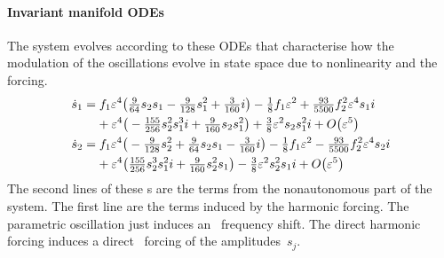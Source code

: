  
\paragraph{Invariant manifold ODEs} 
The system evolves according to these ODEs that characterise
how the modulation of the oscillations evolve in state space
due to nonlinearity and the forcing.
\begin{align*}&
\dot s_{1}=f_1 \varepsilon^{4} \big(\tfrac{9}{64} s_{2} s_{1}-\tfrac{9}{128} s_{1}^{2}+\tfrac{3}{160} i
\big)-\tfrac{1}{8} f_1 \varepsilon^{2}
+\tfrac{93}{5500} f_2^{2} \varepsilon^{4} s_{1} i
\\&\qquad{}
+\varepsilon^{4} \big(
-\tfrac{155}{256} s_{2}^{2} s_{1}^{3} i+\tfrac{9}{160} s_{2} s_{1}^{2}\big)
+\tfrac{3}{8} \varepsilon^{2} s
_{2} s_{1}^{2} i+O\big(\varepsilon ^{5}\big)
\\&
\dot s_{2}=f_1 \varepsilon^{4} \big(-\tfrac{9}{128} s_{2}^{2}+\tfrac{9}{64} s_{2} s_{1}-\tfrac{3}{160} i
\big)-\tfrac{1}{8} f_1 \varepsilon^{2}
-\tfrac{93}{5500} f_2^{2} \varepsilon^{4} s_{2} i
\\&\qquad{}
+\varepsilon^{4} \big(
\tfrac{155}{256} s_{2}^{3} s_{1}^{2} i+\tfrac{9}{160} s_{2}^{2} s_{1}\big)
-\tfrac{3}{8} \varepsilon^{2} s_
{2}^{2} s_{1} i+O\big(\varepsilon ^{5}\big)
\end{align*}
The second lines of these \ode{}s are the terms from the nonautonomous part of the system.   The first line are the terms induced by the harmonic forcing.  The parametric oscillation just induces an~ frequency shift.  The direct harmonic forcing induces a direct~ forcing of the amplitudes~\(s_j\).

